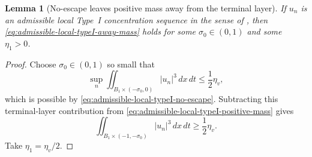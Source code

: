\documentclass[11pt]{amsart}
\numberwithin{equation}{section}
\theoremstyle{plain}
\newtheorem{lemma}[theorem]{Lemma}
\theoremstyle{definition}
\theoremstyle{remark}
\begin{document}
\begin{lemma}[No-escape leaves positive mass away from the terminal layer]
\label{lem:local-no-escape-away-mass}
If \(u_n\) is an admissible local Type~I concentration sequence in the sense of
, then
\eqref{eq:admissible-local-typeI-away-mass} holds for some
\(\sigma_0\in(0,1)\) and some \(\eta_1>0\).
\end{lemma}

\begin{proof}
Choose \(\sigma_0\in(0,1)\) so small that
\[
   \sup_n
   \iint_{B_1\times(-\sigma_0,0)} |u_n|^3\,dx\,dt
   \le \frac12\eta_v ,
\]
which is possible by \eqref{eq:admissible-local-typeI-no-escape}.  Subtracting
this terminal-layer contribution from
\eqref{eq:admissible-local-typeI-positive-mass} gives
\[
   \iint_{B_1\times(-1,-\sigma_0)} |u_n|^3\,dx\,dt
   \ge \frac12\eta_v .
\]
Take \(\eta_1=\eta_v/2\).
\end{proof}
\end{document}
